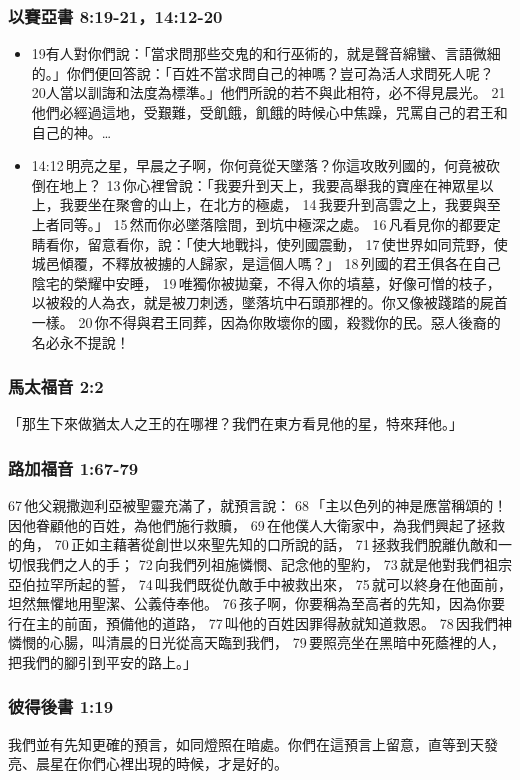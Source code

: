 \subsubsection{以賽亞書 8:19-21，14:12-20}
\begin{itemize} 
\itemsep-.25em
\item 19有人對你們說：「當求問那些交鬼的和行巫術的，就是聲音綿蠻、言語微細的。」你們便回答說：「百姓不當求問自己的神嗎？豈可為活人求問死人呢？ 20人當以訓誨和法度為標準。」他們所說的若不與此相符，必不得見晨光。 21他們必經過這地，受艱難，受飢餓，飢餓的時候心中焦躁，咒罵自己的君王和自己的神。…
\item 14:12 明亮之星，早晨之子啊，你何竟從天墜落？你這攻敗列國的，何竟被砍倒在地上？ 13 你心裡曾說：「我要升到天上，我要高舉我的寶座在神眾星以上，我要坐在聚會的山上，在北方的極處， 14 我要升到高雲之上，我要與至上者同等。」 15 然而你必墜落陰間，到坑中極深之處。 16 凡看見你的都要定睛看你，留意看你，說：「使大地戰抖，使列國震動， 17 使世界如同荒野，使城邑傾覆，不釋放被擄的人歸家，是這個人嗎？」 18 列國的君王俱各在自己陰宅的榮耀中安睡， 19 唯獨你被拋棄，不得入你的墳墓，好像可憎的枝子，以被殺的人為衣，就是被刀刺透，墜落坑中石頭那裡的。你又像被踐踏的屍首一樣。 20 你不得與君王同葬，因為你敗壞你的國，殺戮你的民。惡人後裔的名必永不提說！
\end{itemize} 

\subsubsection{馬太福音 2:2}
「那生下來做猶太人之王的在哪裡？我們在東方看見他的星，特來拜他。」

\subsubsection{路加福音 1:67-79}
67 他父親撒迦利亞被聖靈充滿了，就預言說： 68 「主以色列的神是應當稱頌的！因他眷顧他的百姓，為他們施行救贖， 69 在他僕人大衛家中，為我們興起了拯救的角， 70 正如主藉著從創世以來聖先知的口所說的話， 71 拯救我們脫離仇敵和一切恨我們之人的手； 72 向我們列祖施憐憫、記念他的聖約， 73 就是他對我們祖宗亞伯拉罕所起的誓， 74 叫我們既從仇敵手中被救出來， 75 就可以終身在他面前，坦然無懼地用聖潔、公義侍奉他。 76 孩子啊，你要稱為至高者的先知，因為你要行在主的前面，預備他的道路， 77 叫他的百姓因罪得赦就知道救恩。 78 因我們神憐憫的心腸，叫清晨的日光從高天臨到我們， 79 要照亮坐在黑暗中死蔭裡的人，把我們的腳引到平安的路上。」

\subsubsection{彼得後書 1:19}
我們並有先知更確的預言，如同燈照在暗處。你們在這預言上留意，直等到天發亮、晨星在你們心裡出現的時候，才是好的。

